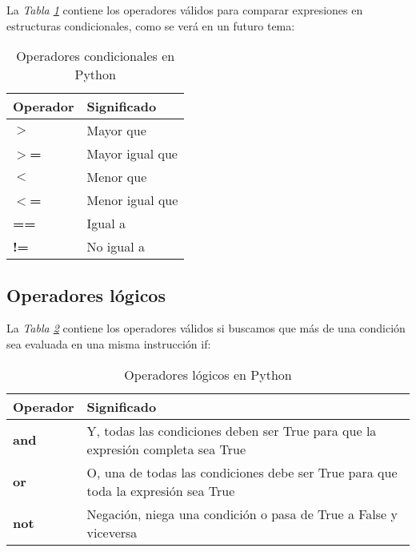 La \textit{Tabla \ref{tab: 3}} contiene los operadores válidos para comparar expresiones en estructuras condicionales, como se verá en un futuro tema:
\begin{table}[H]
    \begin{center}
        \caption{Operadores condicionales en Python}
        \label{tab: 3}
        \begin{tabular}{m{3cm} m{3cm}}
            \hline
            \textbf{Operador} & \textbf{Significado} \\
            \hline
            \textbf{$>$}	& Mayor que \\
            \textbf{$>$=}	& Mayor igual que \\
            \textbf{$<$}	& Menor que \\
            \textbf{$<$=}	& Menor igual que \\
            \textbf{==}		& Igual a \\
            \textbf{!=}		& No igual a \\
            \hline
        \end{tabular}
    \end{center}
\end{table}


\subsection{Operadores lógicos}

La \textit{Tabla \ref{tab: 4}} contiene los operadores válidos si buscamos que más de una condición sea evaluada en una misma instrucción if:
\begin{table}[H]
    \begin{center}
        \caption{Operadores lógicos en Python}
        \label{tab: 4}
        \begin{tabular}{m{3cm} m{10cm}}
            \hline
            \textbf{Operador} & \textbf{Significado} \\
            \hline
            \textbf{and	}	& Y, todas las condiciones deben ser True para que la expresión completa sea True \\
            \textbf{or}		& O, una de todas las condiciones debe ser True para que toda la expresión sea True \\
            \textbf{not}	& Negación, niega una condición o pasa de True a False y viceversa \\
            \hline
        \end{tabular}
    \end{center}
\end{table}


